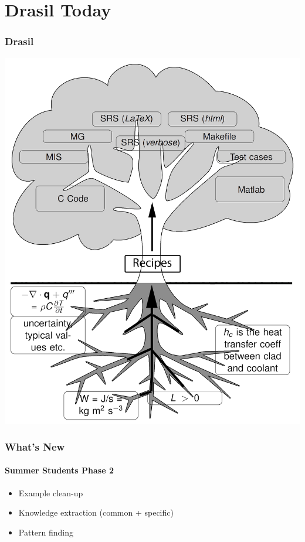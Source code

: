 \documentclass{beamer}
\begin{document}

\section[Drasil]{Drasil Today}


\begin{frame}

\frametitle{Drasil}
\begin{center}
\includegraphics[width=.65\textwidth]{tree.png}
\end{center}

\end{frame}


\begin{frame}

\frametitle{What's New}
\framesubtitle{Summer Students Phase 2}

\begin{itemize}
	\item Example clean-up
	\item Knowledge extraction (common + specific)
	\item Pattern finding
\end{itemize}

\end{frame}

\end{document}
